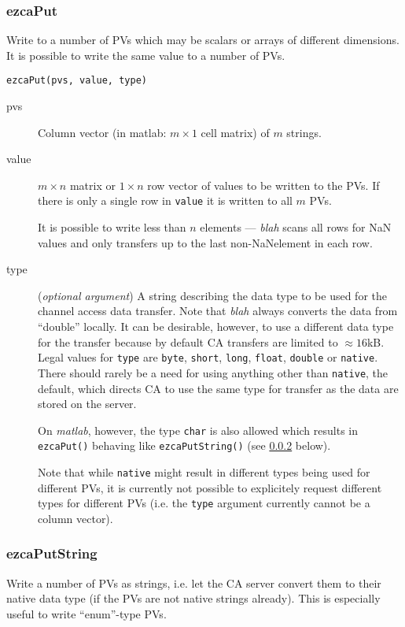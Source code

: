\documentclass{article}
\newcommand{\sca}{{\em blah}}
\newcommand{\matlab}{{\em matlab}}
\newcommand{\com}[1]{{\tt #1}}
\newcommand{\NAN}{\mbox{NaN}}
\newcommand{\PVITEM}{
\item[pvs] Column vector (in matlab: $m\times 1$ cell matrix)
of $m$ strings.
}
\begin{document}
\subsubsection{ezcaPut}
Write to a number of PVs which may be scalars or arrays of different
dimensions. It is possible to write the same value to a number of PVs.
\begin{verbatim}
ezcaPut(pvs, value, type)
\end{verbatim}
\begin{description}
\PVITEM
%
%
\item[value] $m\times n$ matrix or $1\times n$ row vector of values
to be written to the PVs. If there is only a single row in \com{value}{}
it is written to all $m$ PVs.

It is possible to write less than $n$ elements --- \sca{} scans all rows
for \NAN{} values and only transfers up to the last non-\NAN element in each
row.
%
%
\item[type] ({\em optional argument}) A string describing the
data type to be used for the channel access data transfer. Note
that \sca{} always converts the data from ``double'' locally. It
can be desirable, however, to use a different data type for the
transfer because by default CA transfers are limited to $\approx 16$kB.
Legal values for \com{type}{} are \com{byte}, \com{short}, \com{long},
\com{float}, \com{double} or \com{native}. There should rarely
be a need for using anything other than \com{native}, the default,
which directs CA to use the same type for transfer as the data are
stored on the server.

On \matlab{}{}, however, the type \com{char}{} is also allowed which
results in \com{ezcaPut()}{} behaving like \com{ezcaPutString()}{}
(see \ref{putstring} below).

Note that while \com{native}{} might result in different types
being used for different PVs, it is currently not possible to
explicitely request different types for different PVs (i.e. the
\com{type}{} argument currently cannot be a column vector).
%
\end{description}

\subsubsection{ezcaPutString}
\label{putstring}
Write a number of PVs as strings, i.e. let the CA server convert
them to their native data type (if the PVs are not native strings already).
This is especially useful to write ``enum''-type PVs.
\end{document}
